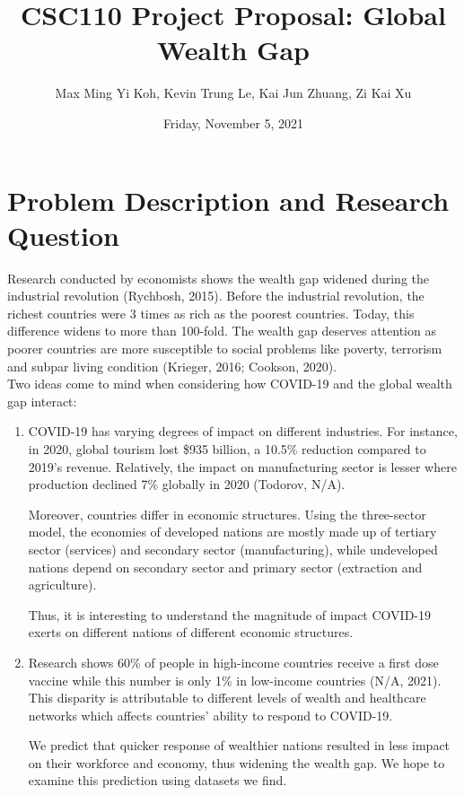 \documentclass[fontsize=11pt]{article}
\title{CSC110 Project Proposal: Global Wealth Gap}
\author{Max Ming Yi Koh, Kevin Trung Le, Kai Jun Zhuang, Zi Kai Xu}
\date{Friday, November 5, 2021}
\begin{document}
\maketitle

\section*{Problem Description and Research Question}
Research conducted by economists shows the wealth gap widened during the industrial revolution (Rychbosh, 2015). Before the industrial revolution, the richest countries were 3 times as rich as the poorest countries. Today, this difference widens to more than 100-fold. The wealth gap deserves attention as poorer countries are more susceptible to social problems like poverty, terrorism and subpar living condition (Krieger, 2016; Cookson, 2020).
\\

\noindent Two ideas come to mind when considering how COVID-19 and the global wealth gap interact:

\begin{enumerate}
    \item COVID-19 has varying degrees of impact on different industries. For instance, in 2020, global tourism lost \$935 billion, a 10.5\% reduction compared to 2019’s revenue. Relatively, the impact on manufacturing sector is lesser where production declined 7\% globally in 2020 (Todorov, N/A).

    Moreover, countries differ in economic structures. Using the three-sector model, the economies of developed nations are mostly made up of tertiary sector (services) and secondary sector (manufacturing), while undeveloped nations depend on secondary sector and primary sector (extraction and agriculture).

    Thus, it is interesting to understand the magnitude of impact COVID-19 exerts on different nations of different economic structures.

    \item Research shows 60\% of people in high-income countries receive a first dose vaccine while this number is only 1\% in low-income countries (N/A, 2021). This disparity is attributable to different levels of wealth and healthcare networks which affects countries’ ability to respond to COVID-19.

    We predict that quicker response of wealthier nations resulted in less impact on their workforce and economy, thus widening the wealth gap. We hope to examine this prediction using datasets we find.
\end{enumerate}
\end{document}
